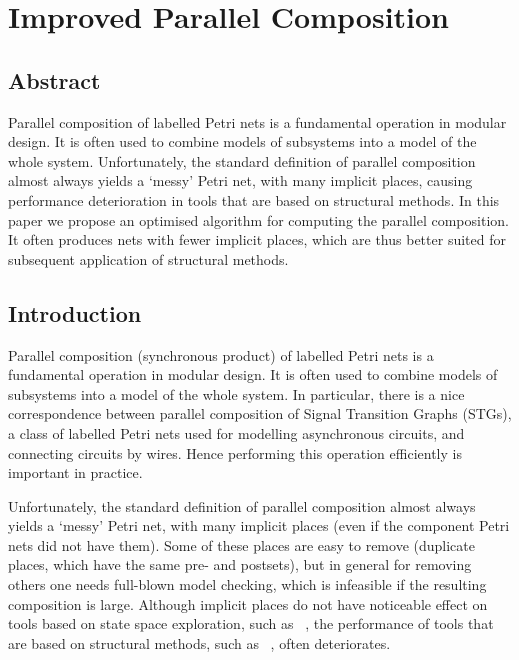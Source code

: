 \section{Improved Parallel Composition}\label{sec_intro}


\subsection{Abstract}
Parallel composition of labelled Petri nets is a fundamental operation in modular design. It is often used to combine models of subsystems into a model of the whole system.
Unfortunately, the standard definition of parallel composition almost always yields a `messy' Petri net, with many implicit places, causing performance deterioration in tools that are based on structural methods. In this paper we propose an optimised algorithm for computing the parallel composition. It often produces nets with fewer implicit places, which are thus better suited for subsequent application of structural methods.

\subsection{Introduction}

Parallel composition (\aka synchronous product) of labelled
Petri nets is a fundamental operation in modular design. It is
often used to combine models of subsystems into a model of the
whole system. In particular, there is a nice correspondence
between parallel composition of Signal Transition Graphs
(STGs), a class of labelled Petri nets used for modelling
asynchronous circuits, and connecting circuits by wires. Hence
performing this operation efficiently is important in practice.

Unfortunately, the standard definition of parallel composition almost always yields a `messy' Petri net, with many implicit places (even if the component Petri nets did not have them). Some of these places are easy to remove (\eg duplicate places, which have the same pre- and postsets), but in general for removing others one needs full-blown model checking, which is infeasible if the resulting composition is large.
Although implicit places do not have noticeable effect on tools based on state space exploration, such as \petrify~\cite{ckkly97}, the performance of tools that are based on structural methods, such as \desij~\cite{Sch07}, often deteriorates.

